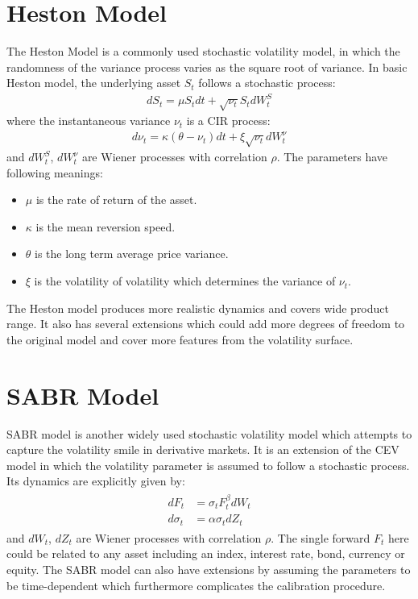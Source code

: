 \section{Heston Model}
The Heston Model is a commonly used stochastic volatility model, in which the randomness of the variance process varies as the square root of variance.
\newline\newline
In basic Heston model, the underlying asset $S_t$ follows a stochastic process:
\begin{align}
dS_t = \mu S_t dt + \sqrt{\nu_t}S_tdW_{t}^S
\end{align}
where the instantaneous variance $\nu_t$ is a CIR process:
\begin{align}
d\nu_t = \kappa\left( \theta - \nu_t\right)  dt + \xi \sqrt{\nu_t}dW_{t}^{\nu}
\end{align}
and $dW_{t}^S$, $dW_{t}^{\nu}$ are Wiener processes with correlation $\rho$.
\newline\newline
The parameters have following meanings:
\begin{itemize}
	\item $\mu$ is the rate of return of the asset.
	\item $\kappa$ is the mean reversion speed.
	\item $\theta$ is the long term average price variance.
	\item $\xi$ is the volatility of volatility which determines the variance of $\nu_t$.
\end{itemize}
The Heston model produces more realistic dynamics and covers wide product range. It also has several extensions which could add more degrees of freedom to the original model and cover more features from the volatility surface.

\section{SABR Model}
SABR model is another widely used stochastic volatility model which attempts to capture the volatility smile in derivative markets. It is an extension of the CEV model in which the volatility parameter is assumed to follow a stochastic process. Its dynamics are explicitly given by:
 \begin{align}
 \begin{aligned}
 dF_t &= \sigma_t F_t^\beta dW_t \\
 d\sigma_t &= \alpha \sigma_t dZ_t
 \end{aligned}
 \end{align}
and $dW_{t}$, $dZ_{t}$ are Wiener processes with correlation $\rho$.
\newline
The single forward $F_t$ here could be related to any asset including an index, interest rate, bond, currency or equity.
\newline\newline
The SABR model can also have extensions by assuming the parameters to be time-dependent which furthermore complicates the calibration procedure.

